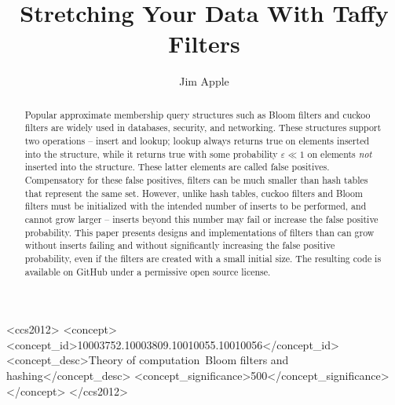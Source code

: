 \documentclass[sigconf]{acmart}
\begin{document}
\title{Stretching Your Data With Taffy Filters}
\ifanon
\else
\author{Jim Apple}
\fi

\begin{CCSXML}
<ccs2012>
   <concept>
       <concept_id>10003752.10003809.10010055.10010056</concept_id>
       <concept_desc>Theory of computation~Bloom filters and hashing</concept_desc>
       <concept_significance>500</concept_significance>
   </concept>
 </ccs2012>
\end{CCSXML}






\begin{abstract}
Popular approximate membership query structures such as Bloom filters and cuckoo filters are widely used in databases, security, and networking.
These structures support two operations -- insert and lookup; lookup always returns true on elements inserted into the structure, while it returns true with some probability $\varepsilon \ll 1$ on elements {\em not} inserted into the structure.
These latter elements are called false positives.
Compensatory for these false positives, filters can be much smaller than hash tables that represent the same set.
However, unlike hash tables, cuckoo filters and Bloom filters must be initialized with the intended number of inserts to be performed, and cannot grow larger --
inserts beyond this number may fail or increase the false positive probability.
This paper presents designs and implementations of filters than can grow without inserts failing and without significantly increasing the false positive probability, even if the filters are created with a small initial size.
The resulting code is available on GitHub under a permissive open source license.
\end{abstract}

\maketitle
\end{document}
